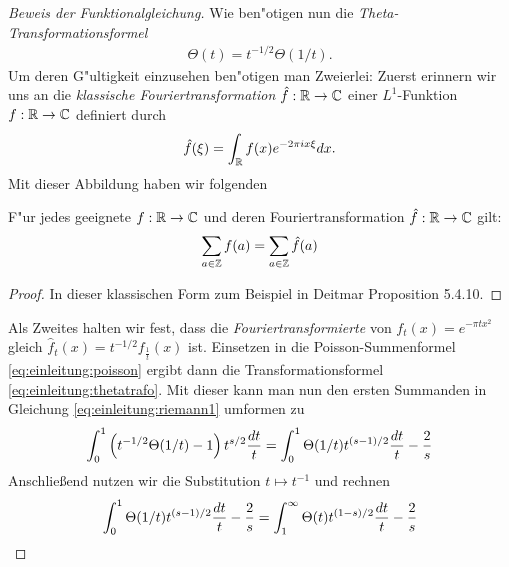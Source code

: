 \begin{proof}[Beweis der Funktionalgleichung]
		Wie ben"otigen nun die \emph{Theta-Transformationsformel}
		\begin{align}
			\Theta(t) = t^{-1/2} \Theta(1/t).\label{eq:einleitung:thetatrafo}
		\end{align}
		Um deren G"ultigkeit einzusehen ben"otigen man Zweierlei: 
		Zuerst erinnern wir uns an die \emph{klassische Fouriertransformation} $\hat{f}:\R\to\Komplex$ einer $L^1$-Funktion $f:\R\to\Komplex$ definiert durch
		\begin{align*}
			\hat{f}(\xi) = \int_\R f(x)e^{-2\pi i x \xi} \dx.
		\end{align*}
		Mit dieser Abbildung haben wir folgenden
		\begin{satz}
			\label{satz:poisson}
			F"ur jedes geeignete $f:\R \to \Komplex$ und deren Fouriertransformation $\hat{f}:\R \to \Komplex$ gilt:
			\begin{align}
				\sum_{a \in \Z} f(a) = \sum_{a \in \Z} \hat{f}(a) \label{eq:einleitung:poisson}
			\end{align}
		\end{satz}
		\begin{proof}
			In dieser klassischen Form zum Beispiel in Deitmar \cite{deitmar2010} Proposition 5.4.10.
		\end{proof}
		Als Zweites halten wir fest, dass die \emph{Fouriertransformierte} von $f_t(x) = e^{-\pi t x^2}$ gleich $\hat{f}_t(x)= t^{-1/2}f_{\frac{1}{t}}(x)$ ist.
		Einsetzen in die Poisson-Summenformel \eqref{eq:einleitung:poisson} ergibt dann die Transformationsformel \eqref{eq:einleitung:thetatrafo}.
		Mit dieser kann man nun den ersten Summanden in Gleichung \eqref{eq:einleitung:riemann1} umformen zu
		\begin{align*}		
			\int_{0}^{1} \left(t^{-1/2}\Theta(1/t)-1\right) t^{s/2}  \frac{\dx[t]}{t} 
				= \int_{0}^{1}\Theta(1/t) t^{(s-1)/2}  \frac{\dx[t]}{t} - \frac{2}{s}
		\end{align*}
		Anschließend nutzen wir die Substitution $t \mapsto t^{-1}$ und rechnen
		\begin{align*}
			\int_{0}^{1}\Theta(1/t) t^{(s-1)/2}  \frac{\dx[t]}{t} - \frac{2}{s}
				&= \int_{1}^{\infty} \Theta(t) t^{(1-s)/2}  \frac{\dx[t]}{t} - \frac{2}{s}\\

\end{align*}
\end{proof}
